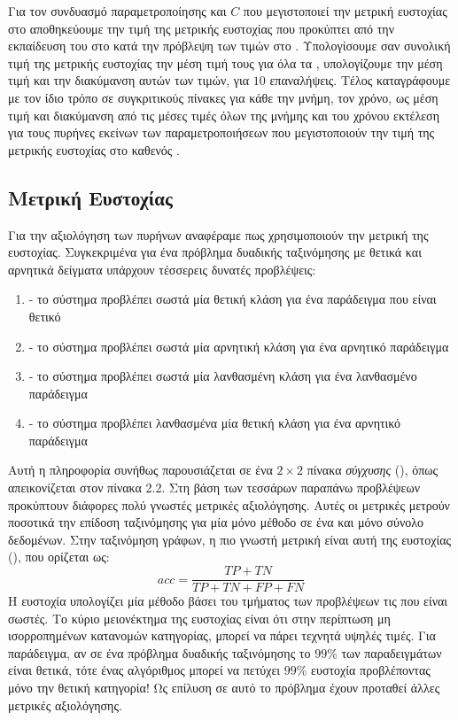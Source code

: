 Για τον συνδυασμό παραμετροποίησης και $C$ που μεγιστοποιεί την μετρική ευστοχίας στο  αποθηκεύουμε την τιμή της μετρικής ευστοχίας που προκύπτει από την εκπαίδευση του  στο  κατά την πρόβλεψη των τιμών στο .
Υπολογίσουμε σαν συνολική τιμή της μετρικής ευστοχίας την μέση τιμή τους για όλα τα , υπολογίζουμε την μέση τιμή και την διακύμανση αυτών των τιμών, για $10$ επαναλήψεις.
Τέλος καταγράφουμε με τον ίδιο τρόπο σε συγκριτικούς πίνακες για κάθε  την μνήμη, τον χρόνο, ως μέση τιμή και διακύμανση από τις μέσες τιμές όλων της μνήμης και του χρόνου εκτέλεση για τους πυρήνες εκείνων των παραμετροποιήσεων που μεγιστοποιούν την τιμή της μετρικής ευστοχίας στο  καθενός .

\subsection{Μετρική Ευστοχίας}
\label{subsection:accuracy}
Για την αξιολόγηση των πυρήνων αναφέραμε πως χρησιμοποιούν την μετρική της ευστοχίας.
Συγκεκριμένα για ένα πρόβλημα δυαδικής ταξινόμησης με θετικά και αρνητικά δείγματα υπάρχουν τέσσερεις δυνατές προβλέψεις:
\begin{enumerate}
    \item {} - το σύστημα προβλέπει σωστά μία θετική κλάση για ένα παράδειγμα που είναι θετικό
    \item {} - το σύστημα προβλέπει σωστά μία αρνητική κλάση για ένα αρνητικό παράδειγμα
    \item {} - το σύστημα προβλέπει σωστά μία λανθασμένη κλάση για ένα λανθασμένο παράδειγμα
    \item {} - το σύστημα προβλέπει λανθασμένα μία θετική κλάση για ένα αρνητικό παράδειγμα
\end{enumerate}
Αυτή η πληροφορία συνήθως παρουσιάζεται σε ένα $2 \times 2$ πίνακα \textit{σύγχυσης} (), όπως απεικονίζεται στον πίνακα 2.2.
Στη βάση των τεσσάρων παραπάνω προβλέψεων προκύπτουν διάφορες πολύ γνωστές μετρικές αξιολόγησης.
Αυτές οι μετρικές μετρούν ποσοτικά την επίδοση ταξινόμησης για μία μόνο μέθοδο σε ένα και μόνο σύνολο δεδομένων.
Στην ταξινόμηση γράφων, η πιο γνωστή μετρική είναι αυτή της ευστοχίας (), που ορίζεται ως:
\begin{equation}
    acc = \frac{TP + TN}{TP + TN + FP + FN}    
\end{equation}
Η ευστοχία υπολογίζει μία μέθοδο βάσει του τμήματος των προβλέψεων τις που είναι σωστές.
Το κύριο μειονέκτημα της ευστοχίας είναι ότι στην περίπτωση μη ισορροπημένων κατανομών κατηγορίας, μπορεί να πάρει τεχνητά υψηλές τιμές.
Για παράδειγμα, αν σε ένα πρόβλημα δυαδικής ταξινόμησης το $99$\% των παραδειγμάτων είναι θετικά, τότε ένας αλγόριθμος μπορεί να πετύχει $99$\% ευστοχία προβλέποντας μόνο την θετική κατηγορία!
Ως επίλυση σε αυτό το πρόβλημα έχουν προταθεί άλλες μετρικές αξιολόγησης.


